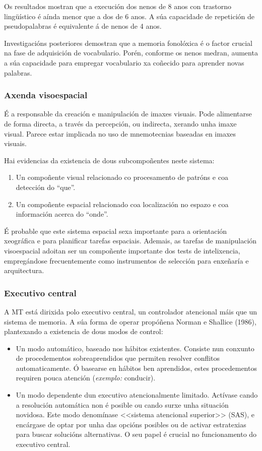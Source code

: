 \documentclass[a4paper,11pt]{article}
\begin{document}
Os resultados mostran que a execución dos nenos de 8 anos con trastorno lingüístico é aínda menor que a dos de 6 anos. A súa capacidade de repetición de pseudopalabras é equivalente á de nenos de 4 anos.

Investigacións posteriores demostran que a memoria fonolóxica é o factor crucial na fase de adquisición de vocabulario. Porén, conforme os nenos medran, aumenta a súa capacidade para empregar vocabulario xa coñecido para aprender novas palabras.

\subsubsection{Axenda visoespacial}
É a responsable da creación e manipulación de imaxes visuais. Pode alimentarse de forma directa, a través da percepción, ou indirecta, xerando unha imaxe visual. Parece estar implicada no uso de mnemotecnias baseadas en imaxes visuais. 

Hai evidencias da existencia de dous subcompoñentes neste sistema:
\begin{enumerate}
	\item Un compoñente visual relacionado co procesamento de patróns e coa detección do ``que''.
	\item Un compoñente espacial relacionado coa localización no espazo e coa información acerca do
	``onde''.
\end{enumerate}

É probable que este sistema espacial sexa importante para a orientación xeográfica e para planificar tarefas espaciais. Ademais, as tarefas de manipulación visoespacial adoitan ser un compoñente importante dos tests de intelixencia, empregándose frecuentemente como instrumentos de selección para enxeñaría e arquitectura. 

\subsubsection{Executivo central}
A MT está dirixida polo executivo central, un controlador atencional máis que un sistema de memoria. A súa forma de operar propóñena Norman e Shallice (1986), plantexando a existencia de dous modos de control:
\begin{itemize}
	\item Un modo automático, baseado nos hábitos existentes. Consiste nun conxunto de procedementos
	sobreaprendidos que permiten resolver conflitos automaticamente. Ó basearse en hábitos ben
	aprendidos, estes procedementos requiren pouca atención (\textit{exemplo:} conducir).
	\item Un modo dependente dun executivo atencionalmente limitado. Actívase cando a resolución
	automática non é posible ou cando surxe unha situación novidosa. Este modo denomínase <<sistema
	atencional superior>> (SAS), e encárgase de optar por unha das opcións posibles ou de activar
	estratexias para buscar solucións alternativas. O seu papel é crucial no funcionamento do
	executivo central.
\end{itemize}
\end{document}
